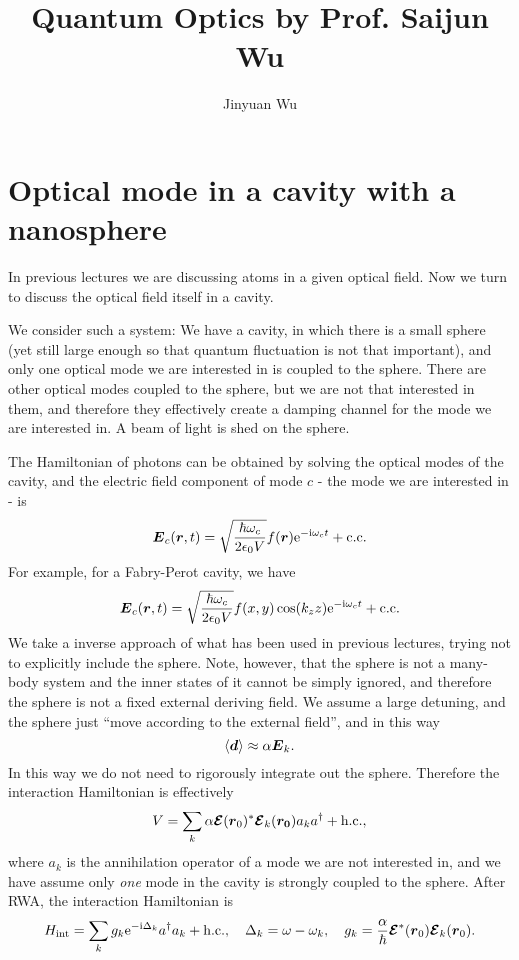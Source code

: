 \documentclass[hyperref, a4paper]{article}
\title{Quantum Optics by Prof. Saijun Wu}
\author{Jinyuan Wu}
\newcommand*{\ii}{\mathrm{i}}
\newcommand*{\ee}{\mathrm{e}}
\begin{document}
\maketitle

\section{Optical mode in a cavity with a nanosphere}

In previous lectures we are discussing atoms in a given optical field. Now we turn to discuss the optical field 
itself in a cavity. 

We consider such a system: We have a cavity, in which there is a small sphere (yet still large enough so that quantum fluctuation is not that important), and only one optical mode we are interested in is coupled to 
the sphere. There are other optical modes coupled to the sphere, but we are not that interested in them, 
and therefore they effectively create a damping channel for the mode we are interested in. 
A beam of light is shed on the sphere.

The Hamiltonian of photons can be obtained by solving the optical modes of the cavity,
and the electric field component of mode $c$ - the mode we are interested in - is 
\begin{equation}
    \vb*{E}_c(\vb*{r}, t) = \sqrt{\frac{\hbar \omega_c}{2 \epsilon_0 V}} f(\vb*{r}) \ee^{- \ii \omega_c t} + \text{c.c}.
\end{equation}
For example, for a Fabry-Perot cavity, we have 
\begin{equation}
    \vb*{E}_c(\vb*{r}, t) = \sqrt{\frac{\hbar \omega_c}{2 \epsilon_0 V}} f(x, y) \cos(k_z z) \ee^{ - \ii \omega_c t} + \text{c.c}.
\end{equation}
We take a inverse approach of what has been used in previous lectures, trying not to explicitly include the sphere. 
Note, however, that the sphere is not a many-body system and the inner states of it cannot be simply ignored, 
and therefore the sphere is not a fixed external deriving field. We assume a large detuning, and the sphere 
just ``move according to the external field'', and in this way 
\begin{equation}
    \expval{\vb*{d}} \approx \alpha \vb*{E}_k.
\end{equation} 
In this way we do not need to rigorously integrate out the sphere. Therefore the interaction Hamiltonian 
is effectively 
\begin{equation}
    V = \sum_k \alpha \vb*{\mathcal{E}}(\vb*{r}_0)^* \vb*{\mathcal{E}}_k(\vb*{r_0}) a_k a^\dagger + \text{h.c.},
\end{equation}
where $a_k$ is the annihilation operator of a mode we are not interested in, and we have assume only 
\emph{one} mode in the cavity is strongly coupled to the sphere. After RWA, the interaction Hamiltonian is 
\begin{equation}
    H_\text{int} = \sum_k g_k \ee^{- \ii \Delta_k} a^\dagger a_k + \text{h.c.}, \quad \Delta_k = \omega - \omega_k, \quad g_k = \frac{\alpha}{\hbar} \vb*{\mathcal{E}}^*(\vb*{r}_0) \vb*{\mathcal{E}}_k(\vb*{r}_0).
\end{equation}
\end{document}
